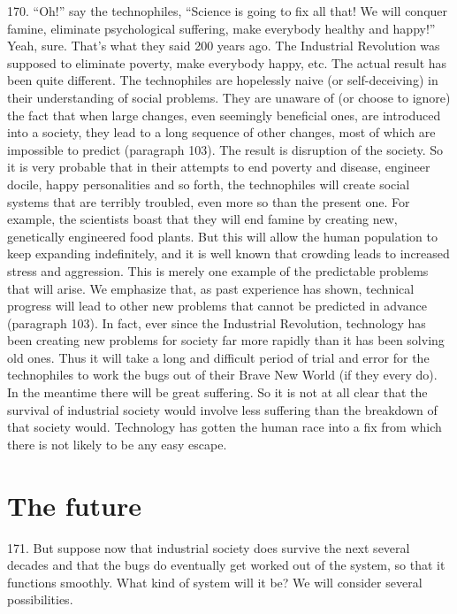 \documentclass{article}
\begin{document}
170.  “Oh!”  say  the  technophiles,  “Science  is  going  to  fix  all  that!  We  will  conquer  famine,  
eliminate psychological suffering, make everybody healthy and happy!” Yeah, sure.  That’s what 
they  said  200  years  ago.   The  Industrial  Revolution  was  supposed  to  eliminate  poverty,  make  
everybody happy, etc.  The actual result has been quite different.  The technophiles are hopelessly 
naive  (or  self-deceiving)  in  their  understanding  of  social  problems.   They  are  unaware  of  (or  
choose to ignore) the fact that when large changes, even seemingly beneficial ones, are introduced 
into  a  society,  they  lead  to  a  long  sequence  of  other  changes,  most  of  which  are  impossible  to  
predict (paragraph 103).  The result is disruption of the society.  So it is very probable that in their 
attempts  to  end  poverty  and  disease,  engineer  docile,  happy  personalities  and  so  forth,  the  
technophiles  will  create  social  systems  that  are  terribly  troubled,  even  more  so  than  the  present  
one.   For  example,  the  scientists  boast  that  they  will  end  famine  by  creating  new,  genetically 
engineered food plants.  But this will allow the human population to keep expanding indefinitely, 
and it is well known that crowding leads to increased stress and aggression.  This is merely one 
example of the predictable problems that will arise.  We emphasize that, as past experience has 
shown,  technical  progress  will  lead  to  other  new  problems  that  cannot  be  predicted  in  advance  
(paragraph 103).  In fact, ever since the Industrial Revolution, technology has been creating new 
problems for society far more rapidly than it has been solving old ones.  Thus it will take a long 
and difficult period of trial and error for the technophiles to work the bugs out of their Brave New 
World (if they every do).  In the meantime there will be great suffering.  So it is not at all clear that 
the survival of industrial society would involve less suffering than the breakdown of that society 
would.  Technology has gotten the human race into a fix from which there is not likely to be any 
easy escape. 


\section{The future}

\hspace{0.5cm} 171.  But suppose now that industrial society does survive the next several decades and that the 
bugs  do  eventually  get  worked  out  of  the  system,  so  that  it  functions  smoothly.   What  kind  of  
system will it be? We will consider several possibilities. \vspace{\baselineskip}
\end{document}
